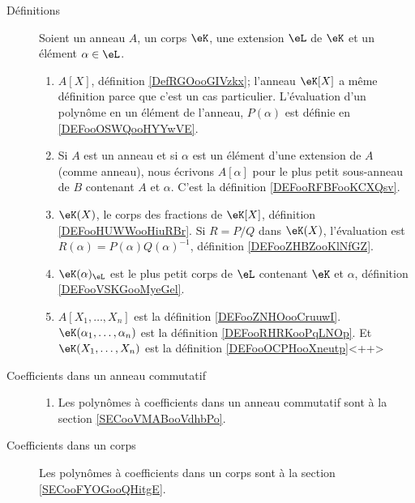 
\begin{description}
    \item[Définitions]
        Soient un anneau \( A\), un corps \( \eK\), une extension \( \eL\) de \( \eK\) et un élément \( \alpha\in \eL\).
        \begin{enumerate}
            \item
                \( A[X]\), définition \ref{DefRGOooGIVzkx}; l'anneau \( \eK[X]\) a même définition parce que c'est un cas particulier. L'évaluation d'un polynôme en un élément de l'anneau, \( P(\alpha)\) est définie en \ref{DEFooOSWQooHYYwVE}.
            \item 
                Si \( A\) est un anneau et si \( \alpha\) est un élément d'une extension de \( A\) (comme anneau), nous écrivons \( A[\alpha]\) pour le plus petit sous-anneau de \( B\) contenant \( A\) et \( \alpha\). C'est la définition \ref{DEFooRFBFooKCXQsv}.
            \item
                \( \eK(X)\), le corps des fractions de \( \eK[X]\), définition \ref{DEFooHUWWooHiuRBr}. Si \( R=P/Q\) dans \( \eK(X)\), l'évaluation est \( R(\alpha)=P(\alpha)Q(\alpha)^{-1}\), définition \ref{DEFooZHBZooKlNfGZ}.
            \item
                \( \eK(\alpha)_{\eL}\) est le plus petit corps de \( \eL\) contenant \( \eK\) et \( \alpha\), définition \ref{DEFooVSKGooMyeGel}.
            \item
                \( A[X_1,\ldots, X_n]\) est la définition \ref{DEFooZNHOooCruuwI}. \( \eK(\alpha_1,\ldots, \alpha_n)\) est la définition \ref{DEFooRHRKooPqLNOp}. Et \( \eK(X_1,\ldots, X_n)\) est la définition \ref{DEFooOCPHooXneutp}<++>
        \end{enumerate}

    \item[Coefficients dans un anneau commutatif]

        \begin{enumerate}
            \item
Les polynômes à coefficients dans un anneau commutatif  sont à la section \ref{SECooVMABooVdhbPo}.
        \end{enumerate}
        

    \item[Coefficients dans un corps]
Les polynômes à coefficients dans un corps sont à la section \ref{SECooFYOGooQHitgE}.
        \begin{enumerate}
                

\end{enumerate}
\end{description}
